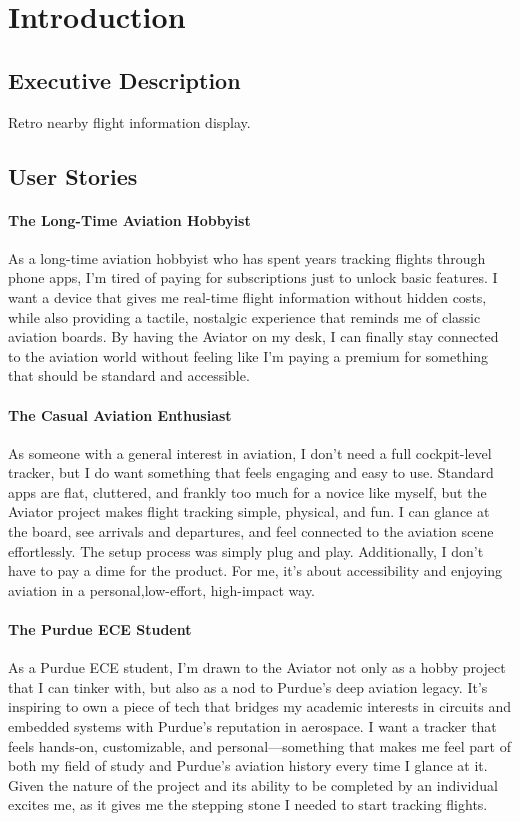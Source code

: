 \clearpage
\section{Introduction}
\subsection{Executive Description}

Retro nearby flight information display.

\subsection{User Stories}

\paragraph{The Long-Time Aviation Hobbyist\newline}
As a long-time aviation hobbyist who has spent years tracking flights through phone apps, I'm tired of paying for subscriptions just to unlock basic features.
I want a device that gives me real-time flight information without hidden costs, while also providing a tactile, nostalgic experience that reminds me of classic aviation boards.
By having the Aviator on my desk, I can finally stay connected to the aviation world without feeling like I'm paying a premium for something that should be standard and accessible.

\paragraph{The Casual Aviation Enthusiast\newline}
As someone with a general interest in aviation, I don't need a full cockpit-level tracker, but I do want something that feels engaging and easy to use.
Standard apps are flat, cluttered, and frankly too much for a novice like myself, but the Aviator project makes flight tracking simple, physical, and fun.
I can glance at the board, see arrivals and departures, and feel connected to the aviation scene effortlessly. The setup process was simply plug and play.
Additionally, I don't have to pay a dime for the product. For me, it's about accessibility and enjoying aviation in a personal,low-effort, high-impact way.

\paragraph{The Purdue ECE Student\newline}
As a Purdue ECE student, I'm drawn to the Aviator not only as a hobby project that I can tinker with, but also as a nod to Purdue's deep aviation legacy.
It's inspiring to own a piece of tech that bridges my academic interests in circuits and embedded systems with Purdue's reputation in aerospace.
I want a tracker that feels hands-on, customizable, and personal—something that makes me feel part of both my field of study and Purdue's aviation history every time I glance at it.
Given the nature of the project and its ability to be completed by an individual excites me, as it gives me the stepping stone I needed to start tracking flights.
